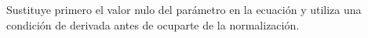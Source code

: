 Sustituye primero el valor nulo del parámetro en la ecuación y utiliza una condición de derivada antes de ocuparte de la normalización.
